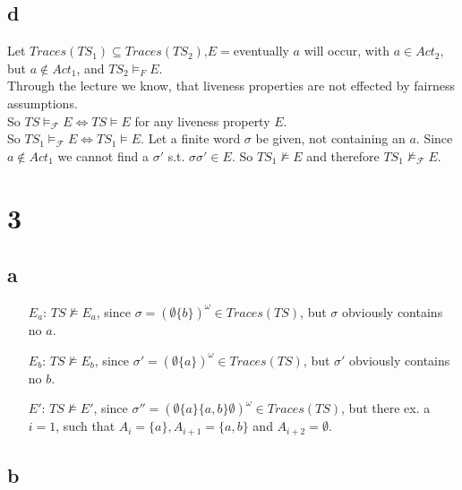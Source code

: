 \documentclass[11pt]{article}
\begin{document}
\subsection{d}

Let $Traces(TS_1)\subseteq Traces(TS_2)$,$E = $eventually $a$ will occur, with $a \in Act_2$, but $a \notin Act_1$, and $TS_2 \models_F E$.\\

Through the lecture we know, that liveness properties are not effected by fairness assumptions.\\
So $TS \models_\mathcal{F} E \Leftrightarrow TS \models E$ for any liveness property $E$.\\

So $TS_1 \models_\mathcal{F} E \Leftrightarrow TS_1 \models E$. Let a finite word $\sigma$ be given, not containing an $a$. 
Since $a\notin Act_1$ we cannot find a $\sigma'$ s.t. $\sigma\sigma' \in E$. So $TS_1 \not\models E$ and therefore $TS_1 \not\models_\mathcal{F} E$.


\section{3}
\subsection{a}
\begin{itemize}
	\item[$E_a$:] $TS \not\models E_a$, since $\sigma = (\emptyset \{b\})^\omega \in Traces(TS)$, but $\sigma$ obviously contains no $a$.
	\item[$E_b$:] $TS \not\models E_b$, since $\sigma' = (\emptyset \{a\})^\omega \in Traces(TS)$, but $\sigma'$ obviously contains no $b$.
	\item[$E'$:] $TS \not\models E'$, since $\sigma'' = (\emptyset\{a\}\{a,b\}\emptyset)^\omega \in Traces(TS)$, but there ex. a $i=1$, such that $A_i=\{a\}, A_{i+1}=\{a,b\}$ and $A_{i+2}=\emptyset$.
\end{itemize}

\subsection{b}
\end{document}
